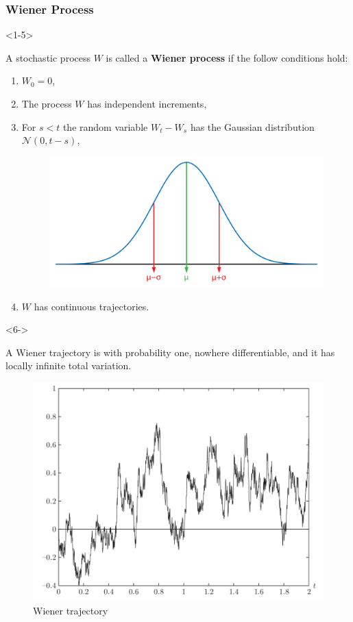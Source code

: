 \documentclass[10pt]{beamer}
\begin{document}
\begin{frame}[t]
  \frametitle{Wiener Process}
  \begin{onlyenv}<1-5>
  \begin{definition}
    A stochastic process $W$ is called a \textbf{Wiener process} if the follow conditions hold:
    \begin{enumerate}
      \item<2-> $W_0 = 0$,
      \item<3-> The process $W$ has independent increments,
      \item<4->
          For $s < t$ the random variable $W_t - W_s$ has the Gaussian distribution $\mathcal{N}(0,t-s)$,
          \begin{figure}
            \centering
            \includegraphics[width=.5\linewidth]{graphics/normal-distribution.png}
          \end{figure}
      \item<5-> $W$ has continuous trajectories.
    \end{enumerate}
  \end{definition}
  \end{onlyenv}
  \begin{onlyenv}<6->
    \begin{theorem}
      A Wiener trajectory is with probability one, nowhere differentiable, and it has locally infinite total variation.
    \end{theorem}
    \begin{figure}
      \includegraphics[scale=.45]{./graphics/wiener-trajectory.png}
      \caption{Wiener trajectory}
    \end{figure}
  \end{onlyenv}
\end{frame}
\end{document}
